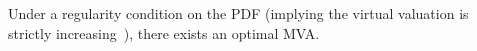 
\begin{theorem}
  Under a regularity condition on the PDF 
 (implying the virtual valuation is strictly
  increasing~\cite{Myerson:1981}),
there exists 
an optimal MVA.
\end{theorem}


